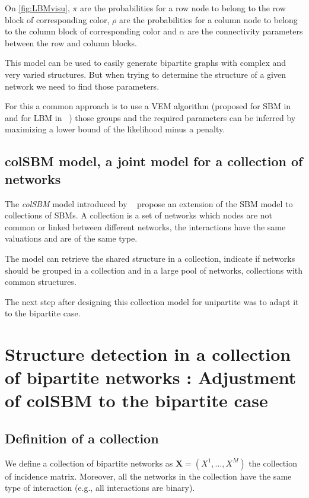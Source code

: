 \documentclass[12pt,a4paper]{report}
\begin{document}
On \ref{fig:LBMvisu}, $\pi$ are the probabilities for a row node to belong to
the row block of corresponding color, $\rho$ are the probabilities for a column
node to belong to the column block of corresponding color and $\alpha$ are the
connectivity parameters between the row and column blocks.

This model can be used to easily generate bipartite graphs with complex and very
varied structures. But when trying to determine the structure of a given network
we need to find those parameters.

For this a common approach is to use a VEM algorithm
(proposed for SBM in ~\cite{daudinMixtureModelRandom2008} and for LBM in ~\cite{govaertEMAlgorithmBlock2005})
those groups and the required parameters can be inferred by maximizing a lower
bound of the likelihood minus a penalty.

\section{colSBM model, a joint model for a collection of networks}
\label{sec:colsbm-model-a-joint-model-for-a-collection-of-networks}
The \emph{colSBM} model introduced by ~\cite{chabert-liddellLearningCommonStructures2023}
propose an extension of the SBM model to collections of SBMs. A collection is a
set of networks which nodes are not common or linked between different networks,
the interactions have the same valuations and are of the same type.

The model can retrieve the shared structure in a collection, indicate
if networks should be grouped in a collection and  in a large pool of networks,
collections with common structures.

The next step after designing this collection model for unipartite was to adapt
it to the bipartite case.

\chapter{Structure detection in a collection of bipartite networks : Adjustment of colSBM to the bipartite case}
\section{Definition of a collection}\label{sec:definition-of-a-collection}

We define a collection of bipartite networks as $\bm{X} = (X^1, \dots, X^M)$
the collection of incidence matrix. Moreover, all the networks in the collection
have the same type of interaction (e.g., all interactions are binary).
\end{document}
